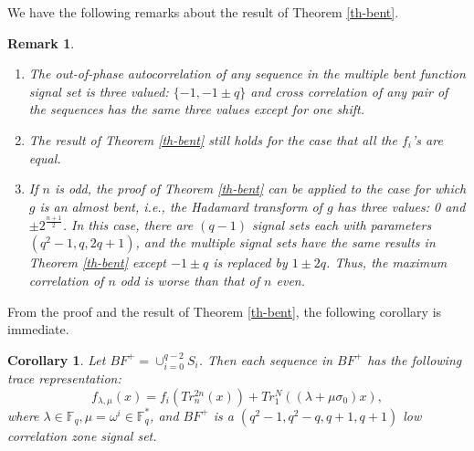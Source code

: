\documentclass{article}
\newtheorem{corollary}{Corollary}
\newtheorem{remark}{Remark}
\newcommand{\F}{\ensuremath{\mathbb F}}
\begin{document}
We have the following remarks about the result of Theorem \ref{th-bent}. 
\begin{remark}
\begin{enumerate}
\item[(a)]  The out-of-phase autocorrelation  of any sequence in the multiple bent function  signal set is three valued: $\{-1, -1\pm q\}$  and cross correlation of any pair of the sequences has the same three values except for one shift.  
\item[(b)]  The result of Theorem \ref{th-bent}  still holds for the case that all the $f_i$'s are equal. 
\item[(c)]  If $n$ is odd, the proof of Theorem \ref{th-bent} can be applied to the case for which $g$ is an almost bent, i.e., the Hadamard transform of $g$ has three values: 0 and $\pm 2^{\frac{n+1}{2}}$. In this case, there are  $(q-1)$ signal sets each with parameters $(q^2-1, q,  2q+1)$, and the multiple signal sets have the same results in Theorem \ref{th-bent} except  $-1\pm q$ is replaced by $1\pm 2q$. 
Thus, the maximum correlation of $n$ odd is worse than that of $n$ even. 
\end{enumerate}
\end{remark}

From the proof and the result of Theorem \ref{th-bent},  the
following corollary is immediate.

\begin{corollary} \label{co-bent}
Let $BF^+=\cup_{i=0}^{q-2}S_{i}$. Then each sequence in
$BF^+$ has the following trace representation:
 \[
 f_{\lambda, \mu}(x)=f_i(Tr_n^{2n}(x))+Tr_1^N((\lambda+\mu\sigma_0)x),
 \]
 where $ \lambda \in \F_{q}, \mu = \omega^i \in \F_q^*$, and $BF^+$ is a $(q^2-1,
q^2-q, q+1, q+1)$ low correlation zone signal set.

\end{corollary}
\end{document}
